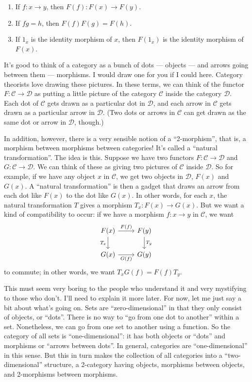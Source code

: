 \documentclass{article}
\begin{document}
\begin{enumerate}
\def\labelenumi{\arabic{enumi})}
\item
  If \(f\colon x \to y\), then \(F(f)\colon F(x) \to F(y)\).
\item
  If \(fg = h\), then \(F(f)F(g) = F(h)\).
\item
  If \(1_x\) is the identity morphism of \(x\), then \(F(1_x)\) is the
  identity morphism of \(F(x)\).
\end{enumerate}

It's good to think of a category as a bunch of dots --- objects --- and
arrows going between them --- morphisms. I would draw one for you if I
could here. Category theorists love drawing these pictures. In these
terms, we can think of the functor
\(F\colon \mathcal{C} \to \mathcal{D}\) as putting a little picture of
the category \(\mathcal{C}\) inside the category \(\mathcal{D}\). Each
dot of \(\mathcal{C}\) gets drawn as a particular dot in
\(\mathcal{D}\), and each arrow in \(\mathcal{C}\) gets drawn as a
particular arrow in \(\mathcal{D}\). (Two dots or arrows in
\(\mathcal{C}\) can get drawn as the same dot or arrow in
\(\mathcal{D}\), though.)

In addition, however, there is a very sensible notion of a
``2-morphism'', that is, a morphism between morphisms between
categories! It's called a ``natural transformation''. The idea is this.
Suppose we have two functors \(F\colon \mathcal{C} \to \mathcal{D}\) and
\(G\colon \mathcal{C} \to \mathcal{D}\). We can think of these as giving
two pictures of \(\mathcal{C}\) inside \(\mathcal{D}\). So for example,
if we have any object \(x\) in \(\mathcal{C}\), we get two objects in
\(\mathcal{D}\), \(F(x)\) and \(G(x)\). A ``natural transformation'' is
then a gadget that draws an arrow from each dot like \(F(x)\) to the dot
like \(G(x)\). In other words, for each \(x\), the natural
transformation \(T\) gives a morphism \(T_x\colon F(x) \to G(x)\). But
we want a kind of compatibility to occur: if we have a morphism
\(f\colon x \to y\) in \(\mathcal{C}\), we want \[
  \begin{tikzcd}
    F(x) \rar["F(f)"] \dar[swap,"T_x"]
    & F(y) \dar["T_y"]
  \\G(x) \rar[swap,"G(f)"]
    & G(y)
  \end{tikzcd}
\] to commute; in other words, we want \(T_x G(f) = F(f) T_y\).

This must seem very boring to the people who understand it and very
mystifying to those who don't. I'll need to explain it more later. For
now, let me just say a bit about what's going on. Sets are
``zero-dimensional'' in that they only consist of objects, or ``dots''.
There is no way to ``go from one dot to another'' within a set.
Nonetheless, we can go from one set to another using a function. So the
category of all sets is ``one-dimensional'': it has both objects or
``dots'' and morphisms or ``arrows between dots''. In general,
categories are ``one-dimensional'' in this sense. But this in turn makes
the collection of all categories into a ``two-dimensional'' structure, a
2-category having objects, morphisms between objects, and 2-morphisms
between morphisms.
\end{document}
